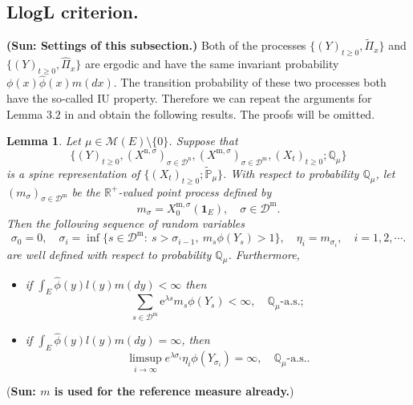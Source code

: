 \documentclass[12pt,a4paper]{amsart}
\numberwithin{equation}{section}
\theoremstyle{plain}
\newtheorem{lem}[thm]{Lemma}
\theoremstyle{definition}
\begin{document}
\subsection{LlogL criterion.}

{\bf (Sun: Settings of this subsection.)}
Both of the processes $\{(Y)_{t\geq 0}, \widetilde\Pi_x\}$ and $\{(Y)_{t\geq 0}, \widehat{\Pi}_x\}$ are ergodic and have the same invariant probability $\phi(x)\widehat\phi(x)m(dx)$.
The transition probability of these two processes both have the so-called IU property.
Therefore we can repeat the arguments for Lemma $3.2$ in \cite{LiuRenSong2009Log} and obtain the following results.
The proofs will be omitted.

\begin{lem}\label{lem:import_lemma}
	Let $\mu \in \mathcal M(E)\setminus \{0\}$.
	Suppose that \[\{(Y)_{t\geq 0}, (X^{\mathrm n, \sigma})_{\sigma\in \mathcal D^\mathrm n}, (X^{\mathrm m, \sigma})_{\sigma \in \mathcal D^\mathrm m}, (X_t)_{t\geq 0}; \mathbb Q_{\mu}\}\] is a spine representation of $\{(X_t)_{t\geq 0}; \widetilde {\mathbb P}_\mu\}$.
	With respect to probability $\mathbb Q_\mu$, let $(m_\sigma)_{\sigma\in \mathcal D^{\mathrm m}}$ be the $\mathbb R^+$-valued point process defined by
  \[
  	m_\sigma = X^{\mathrm m, \sigma}_0(\mathbf 1_E),
  	\quad \sigma \in \mathcal D^{\mathrm m}.
  \]
	Then the following sequence of random variables
  \[
    \sigma_0=0,\quad \sigma_i=\inf\{s\in\mathcal D^{\mathrm m}:\ s>\sigma_{i-1},\ m_s\phi(Y_s)>1\}, \quad\eta_i=m_{\sigma_i},\quad i=1,2,\cdots.
  \]
	are well defined with respect to probability $\mathbb Q_\mu$.
	Furthermore, 
  \begin{itemize}
  \item
    if $\int_E\widehat{\phi}(y)l(y)m(dy)<\infty$ then
  \[
    \sum_{s\in\mathcal D^{\mathrm m}}\mbox{e}^{\lambda s}m_s\phi(Y_s) < \infty, \quad
    \mathbb Q_{\mu}\text{-a.s.};
  \]
\item
  if $ \int_E\widehat{\phi}(y)l(y)m(dy)=\infty$, then
  \[
    \limsup_{i\rightarrow\infty}e^{\lambda \sigma_i}\eta_i
    \phi(Y_{\sigma_i})=\infty,
    \quad \mathbb Q_{\mu}\text{-a.s.}.
  \]
\end{itemize}
\end{lem}

({\bf Sun: $m$ is used for the reference measure already.})
\end{document}
